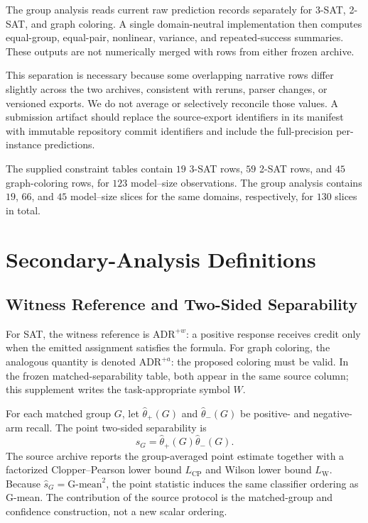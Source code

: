 \documentclass[acmsmall,screen,review,anonymous]{acmart}
\providecommand{\ADRw}{\mathrm{ADR}^{+w}}
\providecommand{\ADRa}{\mathrm{ADR}^{+a}}
\begin{document}
The group analysis reads current raw prediction records separately for
3-SAT, 2-SAT, and graph coloring. A single domain-neutral implementation then
computes equal-group, equal-pair, nonlinear, variance, and repeated-success
summaries. These outputs are not numerically merged with rows from either
frozen archive.

This separation is necessary because some overlapping narrative rows differ
slightly across the two archives, consistent with reruns, parser changes, or
versioned exports. We do not average or selectively reconcile those values.
A submission artifact should replace the source-export identifiers in its
manifest with immutable repository commit identifiers and include the
full-precision per-instance predictions.

The supplied constraint tables contain \(19\) 3-SAT rows, \(59\) 2-SAT rows,
and \(45\) graph-coloring rows, for \(123\) model--size observations. The
group analysis contains \(19\), \(66\), and \(45\) model--size slices for the
same domains, respectively, for \(130\) slices in total.

\section{Secondary-Analysis Definitions}
\label{sec:supp-definitions}

\subsection{Witness Reference and Two-Sided Separability}

For SAT, the witness reference is \(\ADRw\): a positive response receives
credit only when the emitted assignment satisfies the formula. For graph
coloring, the analogous quantity is denoted \(\ADRa\): the proposed coloring
must be valid. In the frozen matched-separability table, both appear in the
same source column; this supplement writes the task-appropriate symbol
\(W\).

For each matched group \(G\), let \(\hat{\theta}_{+}(G)\) and
\(\hat{\theta}_{-}(G)\) be positive- and negative-arm recall. The point
two-sided separability is
\[
\hat{s}_G=\hat{\theta}_{+}(G)\hat{\theta}_{-}(G).
\]
The source archive reports the group-averaged point estimate together with a
factorized Clopper--Pearson lower bound \(L_{\mathrm{CP}}\) and Wilson lower
bound \(L_{\mathrm{W}}\). Because
\(\hat{s}_G=\mathrm{G\mbox{-}mean}^2\), the point statistic induces the same
classifier ordering as G-mean. The contribution of the source protocol is
the matched-group and confidence construction, not a new scalar ordering.
\end{document}
